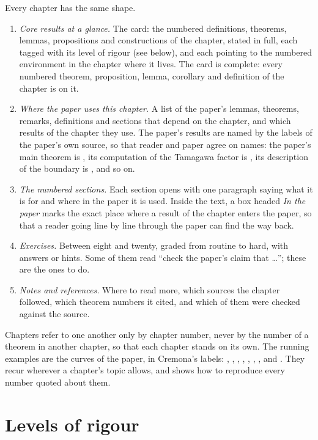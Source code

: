 Every chapter has the same shape.
\begin{enumerate}
\item \emph{Core results at a glance.} The card: the numbered definitions, theorems, lemmas,
propositions and constructions of the chapter, stated in full, each tagged with its level of
rigour (see below), and each pointing to the numbered environment in the chapter where it lives.
The card is complete: every numbered theorem, proposition, lemma, corollary and definition of the
chapter is on it.
\item \emph{Where the paper uses this chapter.} A list of the paper's lemmas, theorems, remarks,
definitions and sections that depend on the chapter, and which results of the chapter they use.
The paper's results are named by the labels of the paper's own source, so that reader and paper
agree on names: the paper's main theorem is , its computation of the
Tamagawa factor is , its description of the boundary is
, and so on.
\item \emph{The numbered sections.} Each section opens with one paragraph saying what it is for
and where in the paper it is used. Inside the text, a box headed \emph{In the paper} marks the
exact place where a result of the chapter enters the paper, so that a reader going line by line
through the paper can find the way back.
\item \emph{Exercises.} Between eight and twenty, graded from routine to hard, with answers or
hints. Some of them read ``check the paper's claim that \ldots''; these are the ones to do.
\item \emph{Notes and references.} Where to read more, which sources the chapter followed, which
theorem numbers it cited, and which of them were checked against the source.
\end{enumerate}
Chapters refer to one another only by chapter number, never by the number of a theorem in another
chapter, so that each chapter stands on its own. The running examples are the curves of
the paper, in Cremona's labels: , , , ,
, , ,  and . They recur wherever a
chapter's topic allows, and  shows how to reproduce every number quoted about
them.

\section*{Levels of rigour}

